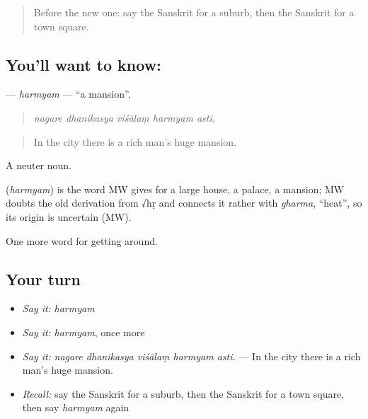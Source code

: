\begin{quote}
Before the new one: say the Sanskrit for a suburb, then the Sanskrit for a town square.
\end{quote}

\subsection*{You'll want to know: }
\textbf{} — \emph{harmyam} — \textquotedblleft{}a mansion\textquotedblright{}.

\begin{quote}
    
\end{quote}

\begin{quote}
\emph{nagare dhanikasya viśālaṃ harmyam asti.}
\end{quote}

\begin{quote}
In the city there is a rich man's huge mansion.
\end{quote}

A neuter noun.

\begin{cousinweb}
\textbf{} (\emph{harmyam}) is the word MW gives for a large house, a palace, a mansion; MW doubts the old derivation from √hṛ and connects it rather with \emph{gharma}, \textquotedblleft{}heat\textquotedblright{}, so its origin is uncertain (MW).
\end{cousinweb}

\begin{grammarlens}[title={What you've built}]
One more word for getting around.
\end{grammarlens}

\subsection*{Your turn}
\begin{itemize}
\raggedright
  \item \emph{Say it:} \emph{harmyam}
  \item \emph{Say it:} \emph{harmyam}, once more
  \item \emph{Say it:} \emph{nagare dhanikasya viśālaṃ harmyam asti.} — In the city there is a rich man's huge mansion.
  \item \emph{Recall:} say the Sanskrit for a suburb, then the Sanskrit for a town square, then say \emph{harmyam} again
\end{itemize}

